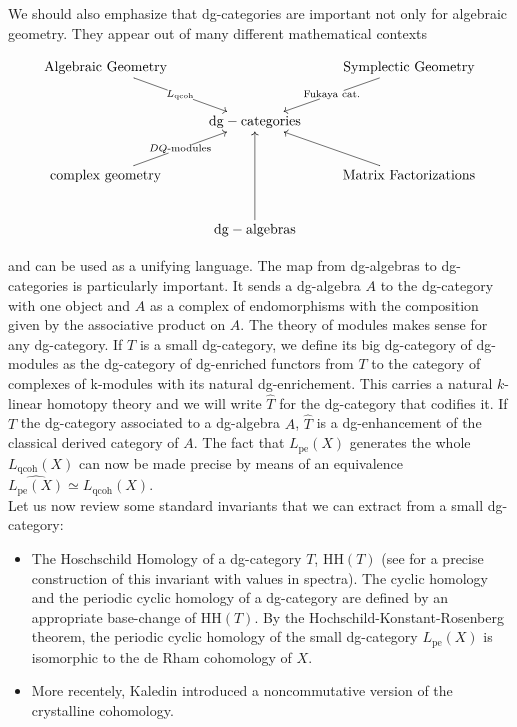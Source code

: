 \begin{refsection}
We should also emphasize that dg-categories are important not only for algebraic geometry. They appear out of many different mathematical contexts

\[
\xymatrix{
\text{Algebraic Geometry}\ar[dr]|-{L_{\mathrm{qcoh}}} && \text{Symplectic Geometry} \ar[dl]|-{\text{Fukaya cat.}} \\
& \mathrm{dg - categories} & \\
\text{complex geometry}\ar[ur]|-{DQ\textrm{-modules}}&& \text{Matrix Factorizations}\ar[ul]\\
& \mathrm{dg - algebras} \ar[uu]
}
\]

\noindent and can be used as a unifying language. The map from dg-algebras to dg-categories is particularly important. It sends a dg-algebra $A$ to the dg-category with one object and $A$ as a complex of endomorphisms with the composition given by the associative product on $A$. The theory of modules makes sense for any dg-category. If $T$ is a small dg-category, we define its big dg-category of dg-modules as the dg-category of  dg-enriched functors from $T$ to the category of complexes of k-modules with its natural dg-enrichement. This carries a natural $k$-linear homotopy theory and we will write $\widehat{T}$ for the dg-category that codifies it.  If $T$ the dg-category associated to a dg-algebra $A$, $\widehat{T}$ is a dg-enhancement of the classical derived category of $A$. The fact that $L_\mathrm{pe}(X)$ generates the whole $L_{\mathrm{qcoh}}(X)$ can now be made precise by means of an equivalence  $\widehat{L_\mathrm{pe}(X)}\simeq  L_{\mathrm{qcoh}}(X)$. \\


Let us now review some standard invariants that we can extract from a small dg-category:

\begin{itemize}
\item The Hoschschild Homology of a dg-category $T$, $\mathrm{HH}(T)$ (see \cite{Anthony-thesis} for a precise construction of this invariant with values in spectra). The cyclic homology and the periodic cyclic homology of a dg-category are defined by an appropriate base-change of $\mathrm{HH}(T)$. By the Hochschild-Konstant-Rosenberg theorem, the periodic cyclic homology of the small dg-category  $L_\mathrm{pe}(X)$ is isomorphic to the de Rham cohomology of $X$.

\item More recentely, Kaledin introduced a noncommutative version of the crystalline cohomology.


\end{itemize}
\end{refsection}
